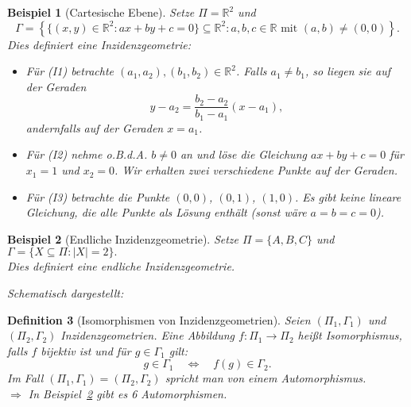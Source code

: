 \documentclass[a4paper,12pt]{article}
\theoremstyle{break}
\newtheorem{definition}{Definition}[section]
\newtheorem{example}[definition]{Beispiel}
\newcommand{\R}{\mathbb{R}}
\begin{document}
\begin{example}[Cartesische Ebene]\label{example:cart_ebene}
Setze \( \Pi = \R^2 \) und 
\[
\Gamma = \left\{ \{(x, y) \in \R^2 : ax + by + c = 0 \} \subseteq \R^2 : a, b, c \in \R \text{ mit } (a, b) \neq (0, 0) \right\}.
\]
Dies definiert eine Inzidenzgeometrie:

\begin{itemize}
    \item Für (I1) betrachte \( (a_1, a_2), (b_1, b_2) \in \R^2 \). Falls \( a_1 \neq b_1 \), so liegen sie auf der Geraden 
    \[
    y - a_2 = \frac{b_2 - a_2}{b_1 - a_1}(x - a_1),
    \]
    andernfalls auf der Geraden \( x = a_1 \).

    \item Für (I2) nehme o.B.d.A. \( b \neq 0 \) an und löse die Gleichung \( ax + by + c = 0 \) für \( x_1 = 1 \) und \( x_2 = 0 \). Wir erhalten zwei verschiedene Punkte auf der Geraden.

    \item Für (I3) betrachte die Punkte \( (0, 0) \), \( (0, 1) \), \( (1, 0) \). Es gibt keine lineare Gleichung, die alle Punkte als Lösung enthält (sonst wäre \( a = b = c = 0 \)).
\end{itemize}
\end{example}

\begin{example}[Endliche Inzidenzgeometrie]\label{example:endl_inzidenz}
Setze \( \Pi = \{ A, B, C \} \) und 
\(\Gamma = \{ X \subseteq \Pi : |X| = 2 \}.\)\\
Dies definiert eine endliche Inzidenzgeometrie.

Schematisch dargestellt:
\begin{center}
\end{center}
\end{example}

\begin{definition}[Isomorphismen von Inzidenzgeometrien]
Seien $(\Pi_1, \Gamma_1)$ und $(\Pi_2, \Gamma_2)$ Inzidenzgeometrien. Eine Abbildung $f: \Pi_1 \to \Pi_2$ heißt Isomorphismus, falls $f$ bijektiv ist und für $g \in \Gamma_1$ gilt:
\[
g \in \Gamma_1 \quad \Leftrightarrow \quad f(g) \in \Gamma_2.
\]
Im Fall $(\Pi_1, \Gamma_1) = (\Pi_2, \Gamma_2)$ spricht man von einem Automorphismus. \\
\(\Rightarrow\) In Beispiel~\ref{example:endl_inzidenz} gibt es 6 Automorphismen.
\end{definition}
\end{document}
